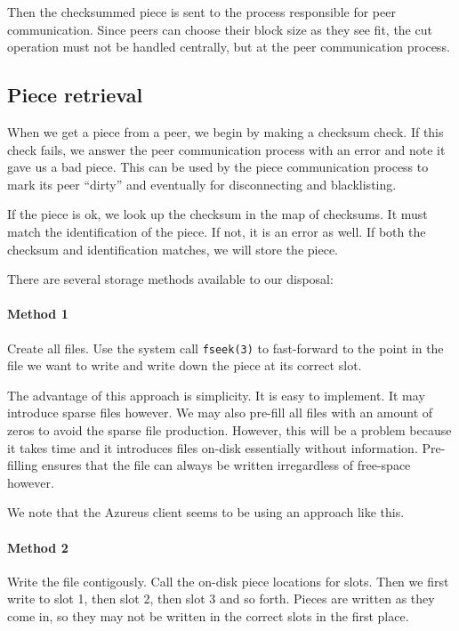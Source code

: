 \documentclass[a4paper]{report}
\begin{document}
Then the checksummed piece is sent to the process responsible for peer
communication. Since peers can choose their block size as they see
fit, the cut operation must not be handled centrally, but at the peer
communication process.

\subsection{Piece retrieval}

When we get a piece from a peer, we begin by making a checksum
check. If this check fails, we answer the peer communication process
with an error and note it gave us a bad piece. This can be used by the
piece communication process to mark its peer ``dirty'' and eventually
for disconnecting and blacklisting.

If the piece is ok, we look up the checksum in the map of
checksums. It must match the identification of the piece. If not, it
is an error as well. If both the checksum and identification matches,
we will store the piece.

There are several storage methods available to our disposal:

\paragraph{Method 1}
Create all files. Use the system call \texttt{fseek(3)} to
fast-forward to the point in the file we want to write and write down
the piece at its correct slot.

The advantage of this approach is simplicity. It is easy to
implement. It may introduce sparse files however. We may also pre-fill
all files with an amount of zeros to avoid the sparse file
production. However, this will be a problem because it takes time and
it introduces files on-disk essentially without
information. Pre-filling ensures that the file can always be written
irregardless of free-space however.

We note that the Azureus client seems to be using an approach like
this.

\paragraph{Method 2}
Write the file contigously. Call the on-disk piece locations for
slots. Then we first write to slot 1, then slot 2, then slot 3 and so
forth. Pieces are written as they come in, so they may not be written
in the correct slots in the first place.
\end{document}
